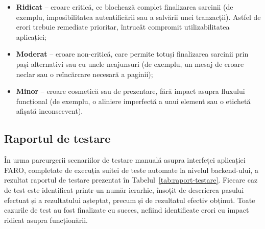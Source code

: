 \documentclass[12pt,a4paper,oneside]{report}
\begin{document}
\begin{itemize}[leftmargin=2cm,itemsep=2pt]
    \item \textbf{Ridicat} -- eroare critică, ce blochează complet finalizarea sarcinii (de exemplu, imposibilitatea autentificării sau a salvării unei tranzacții). Astfel de erori trebuie remediate prioritar, întrucât compromit utilizabilitatea aplicației;
    \item \textbf{Moderat} -- eroare non-critică, care permite totuși finalizarea sarcinii prin pași alternativi sau cu unele neajunsuri (de exemplu, un mesaj de eroare neclar sau o reîncărcare necesară a paginii);
    \item \textbf{Minor} -- eroare cosmetică sau de prezentare, fără impact asupra fluxului funcțional (de exemplu, o aliniere imperfectă a unui element sau o etichetă afișată inconsecvent).
\end{itemize}

\subsection{Raportul de testare}

În urma parcurgerii scenariilor de testare manuală asupra interfeței aplicației FARO, completate de execuția suitei de teste automate la nivelul backend-ului, a rezultat raportul de testare prezentat în Tabelul~\ref{tab:raport-testare}. Fiecare caz de test este identificat printr-un număr ierarhic, însoțit de descrierea pasului efectuat și a rezultatului așteptat, precum și de rezultatul efectiv obținut. Toate cazurile de test au fost finalizate cu succes, nefiind identificate erori cu impact ridicat asupra funcționării.
\end{document}

